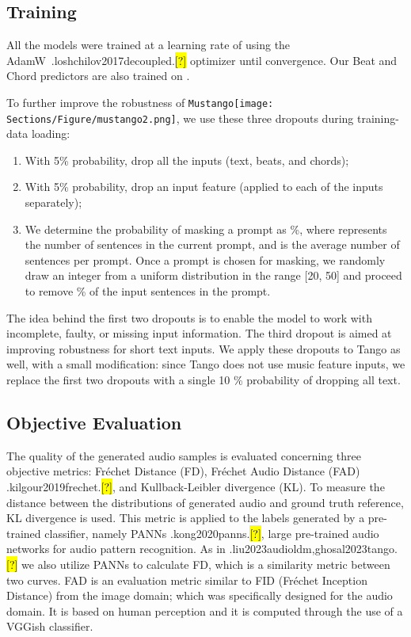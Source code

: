 \documentclass[11pt]{article}
\let\realcite\cite
\renewcommand{\cite}[1]{\ifx.#1.\hl{[?]}\else\realcite{#1}\fi}
\newcommand{\model}{\texttt{Mustango}}
\newcommand{\modelemoji}{\model{}\texttt{[image: Sections/Figure/mustango2.png]}}
\begin{document}
\subsection{Training}
\label{sec:trainsetup}
All the models were trained at a learning rate of  using the AdamW~\cite{loshchilov2017decoupled} optimizer until convergence.
Our Beat and Chord predictors are also trained on \dataset{}.

To further improve the robustness of \modelemoji{}, we use these three dropouts during training-data loading:
\begin{enumerate}[itemsep=0pt, leftmargin=*, wide, labelwidth=0pt, labelindent=0pt, parsep=0pt]
    \item With 5\% probability, drop all the inputs (text, beats, and chords);
    \item With 5\% probability, drop an input feature (applied to each of the inputs separately);
    \item We determine the probability of masking a prompt as \%, where  represents the number of sentences in the current prompt, and  is the average number of sentences per prompt. Once a prompt is chosen for masking, we randomly draw an integer  from a uniform distribution in the range [20, 50] and proceed to remove \% of the input sentences in the prompt.
\end{enumerate}


The idea behind the first two dropouts is to enable the model to work with incomplete, faulty, or missing input information. The third dropout is aimed at improving robustness for short text inputs. We apply these dropouts to Tango as well, with a small modification: since Tango does not use music feature inputs, we replace the first two dropouts with a single 10 \% probability of dropping all text.







\subsection{Objective Evaluation}
\label{sec:objeval}
The quality of the generated audio samples is evaluated concerning three objective metrics: Fréchet Distance (FD), Fréchet Audio Distance (FAD) \cite{kilgour2019frechet}, and Kullback-Leibler divergence (KL).
To measure the distance between the distributions of generated audio and ground truth reference, KL divergence is used. This metric is applied to the labels generated by a pre-trained classifier, namely PANNs \cite{kong2020panns}, large pre-trained audio networks for audio pattern recognition. As in \cite{liu2023audioldm,ghosal2023tango} we also utilize PANNs to calculate FD, which is a similarity metric between two curves.
FAD is an evaluation metric similar to FID (Fréchet Inception Distance) from the image domain; which was specifically designed for the audio domain. It is based on human perception and it is computed through the use of a VGGish classifier.
\end{document}
